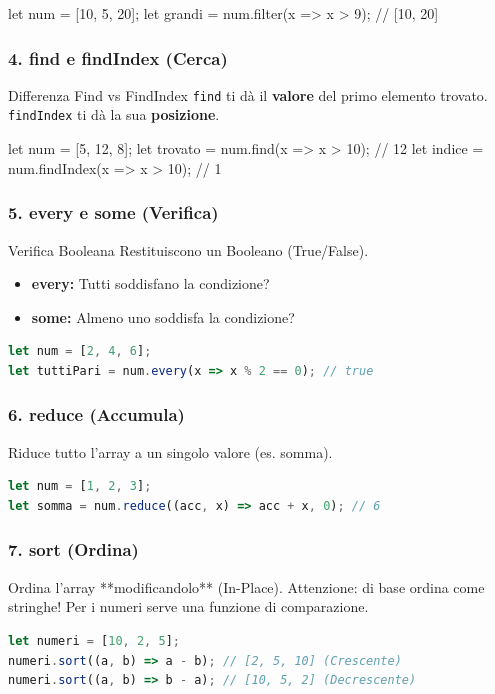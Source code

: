 \begin{jsbox}
let num = [10, 5, 20];
let grandi = num.filter(x => x > 9); // [10, 20]
\end{jsbox}

\subsubsection{4. find e findIndex (Cerca)}
\begin{concept}{Differenza Find vs FindIndex}
\texttt{find} ti dà il \textbf{valore} del primo elemento trovato. \texttt{findIndex} ti dà la sua \textbf{posizione}.
\end{concept}
\begin{jsbox}
let num = [5, 12, 8];
let trovato = num.find(x => x > 10); // 12
let indice = num.findIndex(x => x > 10); // 1
\end{jsbox}

\subsubsection{5. every e some (Verifica)}
\begin{concept}{Verifica Booleana}
Restituiscono un Booleano (True/False).
\begin{itemize}
    \item \textbf{every:} Tutti soddisfano la condizione?
    \item \textbf{some:} Almeno uno soddisfa la condizione?
\end{itemize}
\end{concept}
\begin{lstlisting}[language=JavaScript]
let num = [2, 4, 6];
let tuttiPari = num.every(x => x % 2 == 0); // true
\end{lstlisting}

\subsubsection{6. reduce (Accumula)}
Riduce tutto l'array a un singolo valore (es. somma).
\begin{lstlisting}[language=JavaScript]
let num = [1, 2, 3];
let somma = num.reduce((acc, x) => acc + x, 0); // 6
\end{lstlisting}

\subsubsection{7. sort (Ordina)}
Ordina l'array **modificandolo** (In-Place).
Attenzione: di base ordina come stringhe! Per i numeri serve una funzione di comparazione.
\begin{lstlisting}[language=JavaScript]
let numeri = [10, 2, 5];
numeri.sort((a, b) => a - b); // [2, 5, 10] (Crescente)
numeri.sort((a, b) => b - a); // [10, 5, 2] (Decrescente)
\end{lstlisting}

